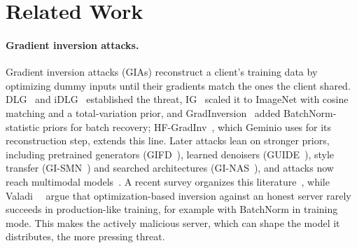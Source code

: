 \section{Related Work}
\label{sec:related}

\paragraph{Gradient inversion attacks.}
Gradient inversion attacks (GIAs) reconstruct a client's training data by optimizing dummy inputs until their gradients match the ones the client shared.
DLG~\cite{dlg2019} and iDLG~\cite{idlg2020} established the threat, IG~\cite{ig2020} scaled it to ImageNet with cosine matching and a total-variation prior, and GradInversion~\cite{gradinversion2021,deepinversion2020} added BatchNorm-statistic priors for batch recovery; HF-GradInv~\cite{hfgradinv2024}, which Geminio uses for its reconstruction step, extends this line.
Later attacks lean on stronger priors, including pretrained generators (GIFD~\cite{fang2023gifd}), learned denoisers (GUIDE~\cite{guide2025}), style transfer (GI-SMN~\cite{gismn2024}) and searched architectures (GI-NAS~\cite{ginas2025}), and attacks now reach multimodal models~\cite{mmgia2025,gidqa2025}.
A recent survey organizes this literature~\cite{guo2026survey}, while Valadi~\etal~\cite{valadi2025feasibility} argue that optimization-based inversion against an honest server rarely succeeds in production-like training, for example with BatchNorm in training mode.
This makes the actively malicious server, which can shape the model it distributes, the more pressing threat.

